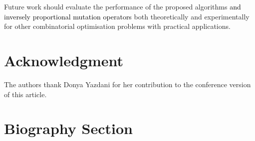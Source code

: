 \documentclass[lettersize,journal]{IEEEtran}
\newcommand{\rev}[1]{\textcolor{black}{#1}}
\begin{document}
Future work should evaluate the performance of the proposed algorithms \rev{and inversely proportional mutation operators} both theoretically and experimentally for other combinatorial optimisation problems with practical applications. 

\section*{Acknowledgment}
The authors thank Donya Yazdani for her contribution to the conference version of this article.






\section{Biography Section}
 
%
%
%

\vspace{-33pt}
\end{document}
